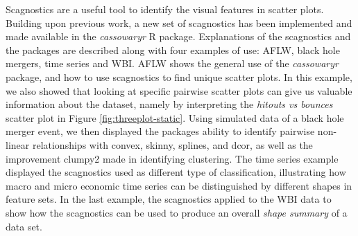 Scagnostics are a useful tool to identify the visual features in scatter
plots. Building upon previous work, a new set of scagnostics has been
implemented and made available in the \emph{cassowaryr} R package.
Explanations of the scagnostics and the packages are described along
with four examples of use: AFLW, black hole mergers, time series and
WBI. AFLW shows the general use of the \emph{cassowaryr} package, and
how to use scagnostics to find unique scatter plots. In this example, we
also showed that looking at specific pairwise scatter plots can give us
valuable information about the dataset, namely by interpreting the
\emph{hitouts vs bounces} scatter plot in Figure
\ref{fig:threeplot-static}. Using simulated data of a black hole merger
event, we then displayed the packages ability to identify pairwise
non-linear relationships with convex, skinny, splines, and dcor, as well
as the improvement clumpy2 made in identifying clustering. The time
series example displayed the scagnostics used as different type of
classification, illustrating how macro and micro economic time series
can be distinguished by different shapes in feature sets. In the last
example, the scagnostics applied to the WBI data to show how the
scagnostics can be used to produce an overall \emph{shape summary} of a
data set.

